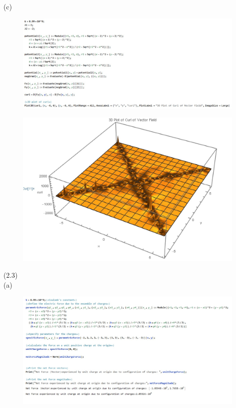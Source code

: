 \documentclass[journal,12pt,onecolumn]{IEEEtran}
\theoremstyle{remark}
\begin{document}
(c)  \begin{figure}[H]
    \centering
     \includegraphics[scale=0.5]{figs/c31.jpeg}
    \caption{}    
    \label{fig:ishitha.em.fig1}
   \end{figure}   
    \begin{figure}[H]
    \centering
     \includegraphics[scale=0.5]{figs/c32.jpeg}
    \caption{}    
    \label{fig:ishitha.em.fig1}
   \end{figure} 
  \newpage    
(2.3)\\
(a)\begin{figure}[H]
    \centering
     \includegraphics[scale=0.5]{figs/f1.jpeg}
    \caption{}    
    \label{fig:ishitha.em.fig1}
   \end{figure} 
 
\end{document}
